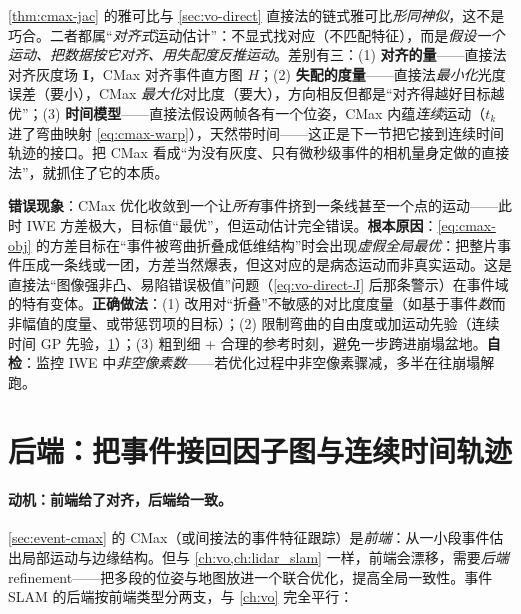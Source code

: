 \begin{insight}
\cref{thm:cmax-jac} 的雅可比与 \cref{sec:vo-direct} 直接法的链式雅可比\emph{形同神似}，这不是巧合。二者都属“\emph{对齐式}运动估计”：不显式找对应（不匹配特征），而是\emph{假设一个运动、把数据按它对齐、用失配度反推运动}。差别有三：(1) \textbf{对齐的量}——直接法对齐灰度场 $\mathbf I$，CMax 对齐事件直方图 $H$；(2) \textbf{失配的度量}——直接法\emph{最小化}光度误差（要小），CMax \emph{最大化}对比度（要大），方向相反但都是“对齐得越好目标越优”；(3) \textbf{时间模型}——直接法假设两帧各有一个位姿，CMax 内蕴\emph{连续}运动（$t_k$ 进了弯曲映射 \cref{eq:cmax-warp}），天然带时间——这正是下一节把它接到连续时间轨迹的接口。把 CMax 看成“为没有灰度、只有微秒级事件的相机量身定做的直接法”，就抓住了它的本质。
\end{insight}

\begin{pitfall}
\textbf{错误现象}：CMax 优化收敛到一个让\emph{所有}事件挤到一条线甚至一个点的运动——此时 IWE 方差极大，目标值“最优”，但运动估计完全错误。\textbf{根本原因}：\cref{eq:cmax-obj} 的方差目标在“事件被弯曲折叠成低维结构”时会出现\emph{虚假全局最优}\cite{gallego2018cmax}：把整片事件压成一条线或一团，方差当然爆表，但这对应的是病态运动而非真实运动。这是直接法“图像强非凸、易陷错误极值”问题（\cref{eq:vo-direct-J} 后那条警示）在事件域的特有变体。\textbf{正确做法}：(1) 改用对“折叠”不敏感的对比度度量（如基于事件\emph{数}而非幅值的度量、或带惩罚项的目标）；(2) 限制弯曲的自由度或加运动先验（连续时间 GP 先验，\cref{sec:event-backend}）；(3) 粗到细 + 合理的参考时刻，避免一步跨进崩塌盆地。\textbf{自检}：监控 IWE 中\emph{非空像素数}——若优化过程中非空像素骤减，多半在往崩塌解跑。
\end{pitfall}

\section{后端：把事件接回因子图与连续时间轨迹}
\label{sec:event-backend}

\paragraph{动机：前端给了对齐，后端给一致。}
\cref{sec:event-cmax} 的 CMax（或间接法的事件特征跟踪）是\emph{前端}：从一小段事件估出局部运动与边缘结构。但与 \cref{ch:vo,ch:lidar_slam} 一样，前端会漂移，需要\emph{后端}refinement——把多段的位姿与地图放进一个联合优化，提高全局一致性\cite{gallego2022eventsurvey}。事件 SLAM 的后端按前端类型分两支，与 \cref{ch:vo} 完全平行：

